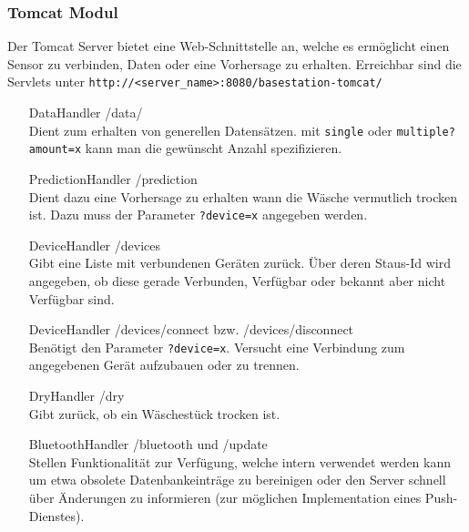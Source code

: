 \subsubsection{Tomcat Modul}
Der Tomcat Server bietet eine Web-Schnittstelle an, welche es ermöglicht einen Sensor zu verbinden, Daten oder eine Vorhersage zu erhalten.
Erreichbar sind die Servlets unter \texttt{http://<server\_name>:8080/basestation-tomcat/}
\begin{enumerate}
\item[DataHandler] /data/ \\
Dient zum erhalten von generellen Datensätzen. mit \texttt{single} oder \texttt{multiple?amount=x} kann man die gewünscht Anzahl spezifizieren.
\item[PredictionHandler] /prediction \\
Dient dazu eine Vorhersage zu erhalten wann die Wäsche vermutlich trocken ist. Dazu muss der Parameter \texttt{?device=x} angegeben werden.
\item[DeviceHandler] /devices \\
Gibt eine Liste mit verbundenen Geräten zurück. Über deren Staus-Id wird angegeben, ob diese gerade Verbunden, Verfügbar oder bekannt aber nicht Verfügbar sind.
\item[DeviceHandler] /devices/connect bzw. /devices/disconnect \\
Benötigt den Parameter \texttt{?device=x}. Versucht eine Verbindung zum angegebenen Gerät aufzubauen oder zu trennen.
\item[DryHandler] /dry \\
Gibt zurück, ob ein Wäschestück trocken ist.
\item[BluetoothHandler] /bluetooth und /update \\
Stellen Funktionalität zur Verfügung, welche intern verwendet werden kann um etwa obsolete Datenbankeinträge zu bereinigen oder den Server schnell über Änderungen zu informieren (zur möglichen Implementation eines Push-Dienstes).
\end{enumerate}
